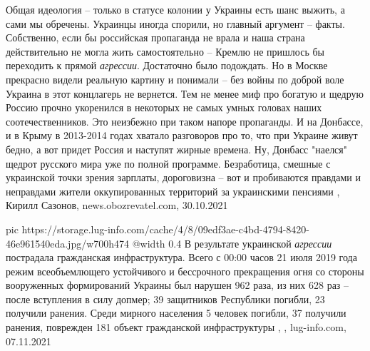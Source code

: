 Общая идеология – только в статусе колонии у Украины есть шанс выжить, а сами
мы обречены. Украинцы иногда спорили, но главный аргумент – факты. Собственно,
если бы российская пропаганда не врала и наша страна действительно не могла
жить самостоятельно – Кремлю не пришлось бы переходить к прямой \emph{агрессии}.
Достаточно было подождать. Но в Москве прекрасно видели реальную картину и
понимали – без войны по доброй воле Украина в этот концлагерь не вернется.
Тем не менее миф про богатую и щедрую Россию прочно укоренился в некоторых не
самых умных головах наших соотечественников. Это неизбежно при таком напоре
пропаганды. И на Донбассе, и в Крыму в 2013-2014 годах хватало разговоров про
то, что при Украине живут бедно, а вот придет Россия и наступят жирные времена.
Ну, Донбасс "наелся" щедрот русского мира уже по полной программе. Безработица,
смешные с украинской точки зрения зарплаты, дороговизна – вот и пробиваются
правдами и неправдами жители оккупированных территорий за украинскими пенсиями
, 
Кирилл Сазонов, news.obozrevatel.com, 30.10.2021

\ifcmt
  pic https://storage.lug-info.com/cache/4/8/09edf3ae-c4bd-4794-8420-46e961540eda.jpg/w700h474%
  @width 0.4
\fi
В результате украинской \emph{агрессии} пострадала гражданская инфраструктура.
Всего с 00:00 часов 21 июля 2019 года режим всеобъемлющего устойчивого и
бессрочного прекращения огня со стороны вооруженных формирований Украины был
нарушен 962 раза, из них 628 раз – после вступления в силу допмер; 39
защитников Республики погибли, 23 получили ранения. Среди мирного населения 5
человек погибли, 37 получили ранения, поврежден 181 объект гражданской
инфраструктуры
, 
, lug-info.com, 07.11.2021

